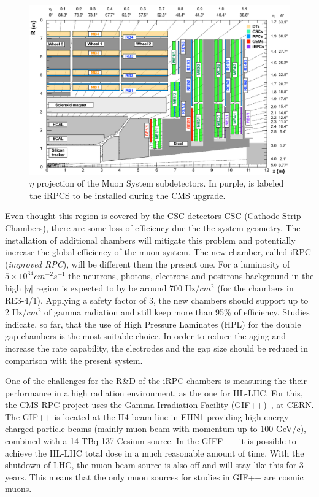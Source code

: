 \begin{figure}[h]
\begin{center}
\includegraphics[width=1.0\textwidth,keepaspectratio]{figures/rpc/muon_eta.png}
\end{center}
\caption{$\eta$ projection of the Muon System subdetectors. In purple, is labeled the iRPCS to be installed during the CMS upgrade.}\label{muons_eta}
\end{figure}

Even thought this region is covered by the CSC detectors CSC (Cathode Strip Chambers), there are some loss of efficiency due the the system geometry. The installation of additional chambers will mitigate this problem and potentially increase the global efficiency of the muon system. The new chamber, called iRPC (\textit{improved RPC}), will be different them the present one. For a luminosity of $5 \times 10^{34} cm^{-2} s^{-1}$  the neutrons, photons, electrons and positrons background in the high $|\eta|$ region is expected to by be around 700 Hz/$cm^{2}$ (for the chambers in RE3-4/1). Applying a safety factor of 3, the new chambers should support up to 2 Hz/$cm^{2}$ of gamma radiation and still keep more than 95\% of efficiency. Studies indicate, so far, that the use of High Pressure Laminates (HPL) for the double gap chambers is the most suitable choice. In order to reduce the aging and increase the rate capability, the electrodes and the gap size should be reduced in comparison with the present system.

One of the challenges for the R\&D of the iRPC chambers is measuring the their performance in a high radiation environment, as the one for HL-LHC. For this, the CMS RPC project uses the Gamma Irradiation Facility (GIF++)~\cite{gifpp}, at CERN. The GIF++ is located at the H4 beam line in EHN1 providing high energy charged particle beams (mainly muon beam with momentum up to 100 GeV/c), combined with a 14 TBq 137-Cesium source. In the GIFF++ it is possible to achieve the HL-LHC total dose in a much reasonable amount of time. With the shutdown of LHC, the muon beam source is also off and will stay like this for 3 years. This means that the only muon sources for studies in GIF++ are cosmic muons. 

